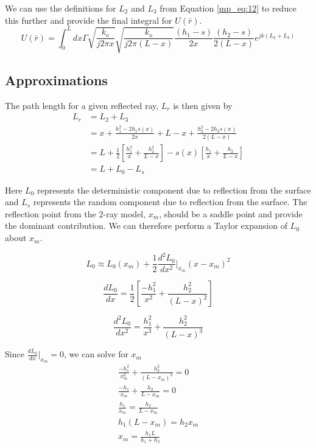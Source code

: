 We can use the definitions for $L_2$ and $L_3$ from Equation \ref{mp_eq:12} to reduce this further and provide the final integral for $U(\bar{r})$.
\begin{equation}
\boxed{U(\bar{r}) =  \int_{0}^L dx \Gamma \sqrt{\frac{k_o}{j2\pi x}}\sqrt{\frac{k_o}{j2\pi(L-x)}}\frac{(h_1-s)}{2x}\frac{(h_2-s)}{2(L-x)}e^{jk(L_2+L_3)}}
\label{mp_eq:12g}
\end{equation}

\subsection{Approximations}
The path length for a given reflected ray, $L_r$ is then given by
\begin{equation}
\begin{aligned}
L_r &= L_2 + L_3 \\
& = x + \frac{h_1^2-2h_1s(x)}{2x} +  L-x + \frac{h_2^2 - 2h_2s(x)}{2\left(L-x\right)} \\
& = L + \frac{1}{2}\left[\frac{h_1^2}{x} + \frac{h_2^2}{L-x} \right] - s(x)\left[ \frac{h_1}{x} + \frac{h_2}{L-x}\right] \\
&= L + L_0 - L_s
\end{aligned}
\label{mp_eq:13}
\end{equation}
\renewcommand{\baselinestretch}{2} \small\normalsize

Here $L_0$ represents the deterministic component due to reflection from the surface and $L_s$ represents the random component due to reflection from the surface. The reflection point from the 2-ray model, $x_m$, should be a saddle point and provide the dominant contribution. We can therefore perform a Taylor expansion of $L_0$ about $x_m$.

\begin{equation}
L_0 \approx L_0(x_m) + \frac{1}{2}\frac{d^2L_0}{dx^2}\bigg|_{x_m}(x-x_m)^2
\label{mp_eq:14}
\end{equation}

\begin{equation}
\frac{dL_0}{dx} = \frac{1}{2}\left[\frac{-h_1^2}{x^2} + \frac{h_2^2}{(L-x)^2} \right]
\label{mp_eq:15}
\end{equation}

\begin{equation}
\frac{d^2L_0}{dx^2} = \frac{h_1^2}{x^3} + \frac{h_2^2}{(L-x)^3} 
\label{mp_eq:16}
\end{equation}

Since $\frac{dL_0}{dx}\big|_{x_m} = 0$, we can solve for $x_m$
\begin{equation}
\begin{gathered}
\frac{-h_1^2}{x_m^2} + \frac{h_2^2}{(L-x_m)^2} = 0\\
\frac{-h_1}{x_m} + \frac{h_2}{L-x_m} = 0\\
\frac{h_1}{x_m} = \frac{h_2}{L-x_m}\\
h_1(L-x_m) = h_2x_m\\
x_m = \frac{h_1L}{h_1+h_2}
\end{gathered}
\label{mp_eq:17}
\end{equation}

